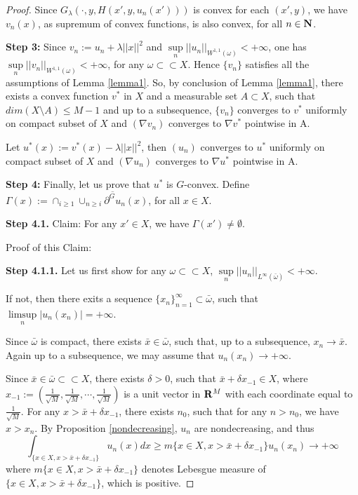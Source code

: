 \begin{proof}
	
	Since $G_{\lambda}(\cdot,y,H(x',y,u_n(x')))$ is convex for each $(x', y)$, we have $v_n(x)$, as supremum of convex functions, is also convex, for all $n \in \mathbf{N}$.\medskip
	
	
	
	{\bf Step 3:}	Since $v_n:= u_n +\lambda||x||^2$ and $\sup\limits_{n}||u_n||_{W^{1,1}(\omega)} < +\infty$, one has $\sup\limits_{n}||v_n||_{W^{1,1}(\omega)} < +\infty$, for any $\omega \subset \subset X$. Hence $\{v_n\}$ satisfies all the assumptions of Lemma \ref{lemma1}. So, by conclusion of Lemma \ref{lemma1}, there exists a convex function $v^*$ in $X$ and a measurable set $A \subset X$, such that $dim (X \setminus A)\le M-1$ and up to a subsequence, $\{v_n\}$ converges to $v^*$ uniformly on compact subset of $X$ and $(\nabla v_n)$ converges to $\nabla v^*$ pointwise in A.
	
	Let $u^*(x):=v^*(x)-\lambda||x||^2$, then  $(u_n)$ converges to $u^*$ uniformly on compact subset of $X$ and $(\nabla u_n)$ converges to $\nabla u^*$ pointwise in A.\medskip
	
	{\bf Step 4:}	Finally, let us prove that $u^*$ is $G$-convex.\medskip
	Define $\Gamma(x):=\cap_{i\ge 1}\overline{\cup_{n\ge i}\partial^G u_n(x)}$, for all $x\in X$.\medskip

	
	{\bf	Step 4.1.} Claim: For any $x'\in X$, we have $\Gamma(x') \neq \emptyset$.
	
	Proof of this Claim: 
	
	{\bf Step 4.1.1.} Let us first show for any $\omega \subset\subset X$, $\sup\limits_{n}||u_n||_{L^{\infty}(\bar{\omega})}<+\infty$.
	
	If not, then there exits a sequence $\{x_n\}_{n=1}^{\infty}\subset \bar{\omega}$, such that $\limsup\limits_{n}|u_n(x_n)|=+\infty$.
	
	Since $\bar{\omega}$ is compact, there exists $\bar{x}\in \bar{\omega}$, such that, up to a subsequence, $x_n\rightarrow \bar{x}$. Again up to a subsequence, we may assume that $u_n(x_n)\rightarrow +\infty$.
	
	Since $\bar{x} \in \bar{\omega} \subset \subset X$, there exists $\delta >0$, such that $\bar{x}+\delta x_{-1} \in X$, where $x_{-1}:=(\frac{1}{\sqrt{M}}, \frac{1}{\sqrt{M}}, \cdots, \frac{1}{\sqrt{M}})$ is a unit vector in ${\mathbf R}^M$ with each coordinate equal to $\frac{1}{\sqrt{M}}$. For any $x>\bar{x} + \delta x_{-1}$, there exists $n_0$, such that for any $n>n_0$, we have $x>x_n$. By Proposition \ref{nondecreasing}, $u_n$ are nondecreasing, and thus
	\begin{equation}\label{eqn_integral}
	\int_{\{x\in X, x>\bar{x} +\delta x_{-1}\}} u_n(x)dx \ge m\{x\in X, x> \bar{x}+\delta x_{-1}\} u_n(x_n)\rightarrow +\infty
	\end{equation}
	where $m\{x\in X, x>\bar{x}+\delta x_{-1}\}$ denotes Lebesgue measure of $\{x\in X, x>\bar{x}+\delta x_{-1}\}$, which is positive.
	

\end{proof}

